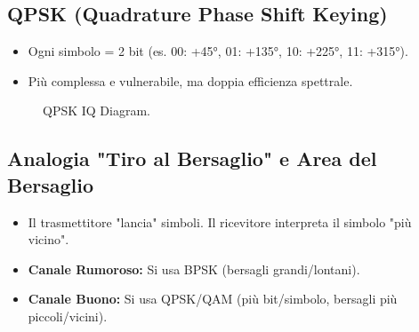 \subsection{QPSK (Quadrature Phase Shift Keying)}
\begin{itemize}
    \item Ogni simbolo = 2 bit (es. 00: +45°, 01: +135°, 10: +225°, 11: +315°).
    \item Più complessa e vulnerabile, ma doppia efficienza spettrale.
\end{itemize}
\begin{figure}[H] \centering
{} \caption{QPSK IQ Diagram.} \end{figure}

\subsection{Analogia "Tiro al Bersaglio" e Area del Bersaglio}
\begin{itemize}
    \item Il trasmettitore "lancia" simboli. Il ricevitore interpreta il simbolo "più vicino".
    \item \textbf{Canale Rumoroso:} Si usa BPSK (bersagli grandi/lontani).
    \item \textbf{Canale Buono:} Si usa QPSK/QAM (più bit/simbolo, bersagli più piccoli/vicini).
\end{itemize}

